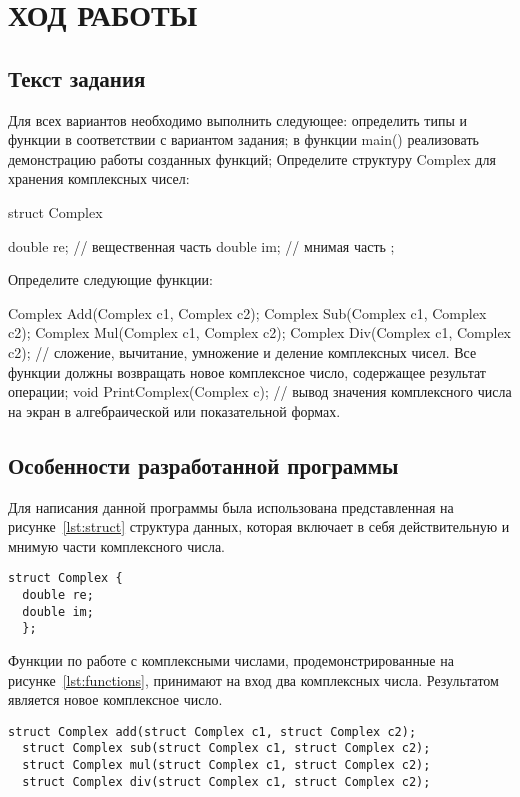 
\section{ХОД РАБОТЫ}

\subsection{Текст задания}

Для всех вариантов необходимо выполнить следующее: определить типы и функции в соответствии с вариантом задания; в функции main() реализовать демонстрацию работы созданных функций; Определите структуру Complex для хранения комплексных чисел: 

struct Complex

{
    double re;  // вещественная часть
    double im;  // мнимая часть
};

Определите следующие функции: 

Complex Add(Complex c1, Complex c2);
Complex Sub(Complex c1, Complex c2);
Complex Mul(Complex c1, Complex c2);
Complex Div(Complex c1, Complex c2); // сложение, вычитание, умножение и деление комплексных чисел. 
Все функции должны возвращать новое комплексное число, содержащее результат операции;
void PrintComplex(Complex c); // вывод значения комплексного числа на экран в алгебраической или показательной формах.

\subsection{Особенности разработанной программы}

Для написания данной программы была использована представленная на рисунке~\ref{lst:struct} структура данных, которая включает в себя действительную и мнимую части комплексного числа. 

\begin{lstlisting}[caption=Структура данных Complex,label=lst:struct]
  struct Complex {
  double re;
  double im;
  };
\end{lstlisting}

Функции по работе с комплексными числами, продемонстрированные на рисунке~\ref{lst:functions}, принимают на вход два комплексных числа. Результатом является новое комплексное число.

\begin{lstlisting}[caption=Функции работы с комплексными числами,label=lst:functions]
  struct Complex add(struct Complex c1, struct Complex c2);
  struct Complex sub(struct Complex c1, struct Complex c2);
  struct Complex mul(struct Complex c1, struct Complex c2);
  struct Complex div(struct Complex c1, struct Complex c2);
\end{lstlisting}

